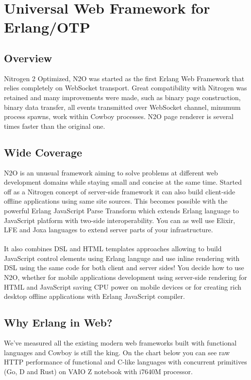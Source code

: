 \section{Universal Web Framework for Erlang/OTP}

\subsection*{Overview}
Nitrogen 2 Optimized, N2O was started as the first Erlang Web Framework
that relies completely on WebSocket transport. Great compatibility with Nitrogen
was retained and many improvements were made, such as binary page construction,
binary data transfer, all events transmitted over WebSocket channel, minumum process spawns,
work within Cowboy processes. N2O page renderer is several times faster
than the original one.

\subsection*{Wide Coverage}
N2O is an unusual framework aiming to solve problems at different web development domains
while staying small and concise at the same time. Started off as a Nitrogen concept
of server-side framework it can also build client-side offline applications
using same site sources. This becomes possible with the powerful Erlang JavaScript Parse
Transform which extends Erlang language to JavaScript platform with two-side
interoperability. You can as well use Elixir, LFE and Joxa languages to extend
server parts of your infrastructure.

\paragraph{}
It also combines DSL and HTML templates approaches allowing to build JavaScript
control elements using Erlang languge and use inline rendering with DSL using
the same code for both client and server sides!
You decide how to use N2O, whether for mobile applications development using server-side rendering
for HTML and JavaScript saving CPU power on mobile devices or for creating rich desktop
offline applications with Erlang JavaScript compiler.

\subsection*{Why Erlang in Web?}
We've measured all the existing modern web frameworks built with functional
languages and Cowboy is still the king. On the chart below you can see raw HTTP
performance of functional and C-like languages with concurrent
primitives (Go, D and Rust) on VAIO Z notebook with i7640M processor.


